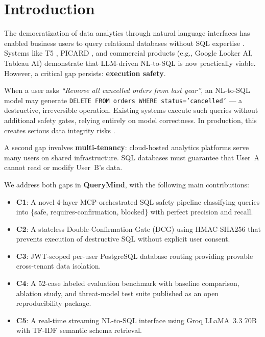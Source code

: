 \documentclass[conference]{IEEEtran}
\begin{document}
\section{Introduction}

The democratization of data analytics through natural language interfaces has enabled business users to query relational databases without SQL expertise \cite{zhao2023survey,yu2018spider}. Systems like T5 \cite{raffel2020t5}, PICARD \cite{scholak2021picard}, and commercial products (e.g., Google Looker AI, Tableau AI) demonstrate that LLM-driven NL-to-SQL is now practically viable. However, a critical gap persists: \textbf{execution safety}.

When a user asks \textit{``Remove all cancelled orders from last year''}, an NL-to-SQL model may generate \texttt{DELETE FROM orders WHERE status='cancelled'} --- a destructive, irreversible operation. Existing systems execute such queries without additional safety gates, relying entirely on model correctness. In production, this creates serious data integrity risks \cite{bernstein2023integrity}.

A second gap involves \textbf{multi-tenancy}: cloud-hosted analytics platforms serve many users on shared infrastructure. SQL databases must guarantee that User~A cannot read or modify User~B's data.

We address both gaps in \textbf{QueryMind}, with the following main contributions:
\begin{itemize}
  \item \textbf{C1}: A novel 4-layer MCP-orchestrated SQL safety pipeline classifying queries into \{safe, requires-confirmation, blocked\} with perfect precision and recall.
  \item \textbf{C2}: A stateless Double-Confirmation Gate (DCG) using HMAC-SHA256 that prevents execution of destructive SQL without explicit user consent.
  \item \textbf{C3}: JWT-scoped per-user PostgreSQL database routing providing provable cross-tenant data isolation.
  \item \textbf{C4}: A 52-case labeled evaluation benchmark with baseline comparison, ablation study, and threat-model test suite published as an open reproducibility package.
  \item \textbf{C5}: A real-time streaming NL-to-SQL interface using Groq LLaMA~3.3 70B with TF-IDF semantic schema retrieval.
\end{itemize}
\end{document}
